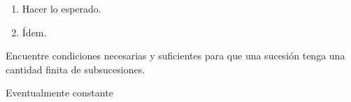 \documentclass{ayudantia}
\begin{document}
\begin{ans}
    \begin{sol}
        \begin{enumerate}[label=(\alph*)]
            \item Hacer lo esperado.
            \item Ídem.
        \end{enumerate}
    \end{sol}
\end{ans}


\begin{prob}
    Encuentre condiciones necesarias y suficientes para que una sucesión tenga una cantidad finita de subsucesiones.
\end{prob}

\begin{ans}
    \begin{sol}
        Eventualmente constante
    \end{sol}
\end{ans}
\end{document}
